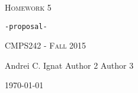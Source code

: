\documentclass{article}
\begin{document}
\begin{center}
\Huge{\textsc{Homework 5}} 

\normalsize{\texttt{-proposal-}}

\Large\textsc{CMPS242 - Fall 2015}

\large{\hfill Andrei  C. Ignat \hfill Author 2 \hfill Author 3 \hfill}

\normalsize\flushright\today
\end{center}
\vfill
\end{document}

